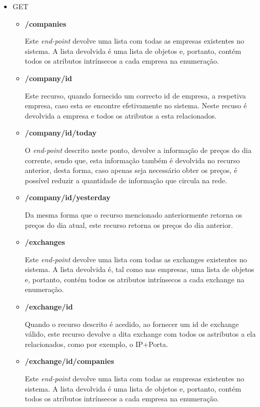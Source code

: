 \documentclass[a4paper,12pt]{article}
\begin{document}
\begin{itemize}
\item GET
  \begin{itemize}
    \item \textbf{/companies}
    \par Este \textit{end-point} devolve uma lista com todas as empresas existentes no sistema. A lista devolvida é uma lista de objetos e, portanto, contém todos os atributos intrínsecos a cada empresa na enumeração.
    
    \item \textbf{/company/{id}}
    \par Este recurso, quando fornecido um correcto id de empresa, a respetiva empresa, caso esta se encontre efetivamente no sistema. Neste recuso é devolvida a empresa e todos os atributos a esta relacionados.
    
    \item \textbf{/company/{id}/today}
    \par O \textit{end-point} descrito neste ponto, devolve a informação de preços do dia corrente, sendo que, esta informação também é devolvida no recurso anterior, desta forma, caso apenas seja necessário obter os preços, é possível reduzir a quantidade de informação que circula na rede.
    
    \item \textbf{/company/{id}/yesterday}
    \par Da mesma forma que o recurso mencionado anteriormente retorna os preços do dia atual, este recurso retorna os preços do dia anterior.
    
    \item \textbf{/exchanges}
    \par Este \textit{end-point} devolve uma lista com todas as exchanges existentes no sistema. A lista devolvida é, tal como nas empresas, uma lista de objetos e, portanto, contém todos os atributos intrínsecos a cada exchange na enumeração.

    \item \textbf{/exchange/{id}}
    \par Quando o recurso descrito é acedido, ao fornecer um id de exchange válido, este recurso devolve a dita exchange com todos os astributos a ela relacionados, como por exemplo, o IP+Porta.

    \item \textbf{/exchange/{id}/companies}
    \par Este \textit{end-point} devolve uma lista com todas as empresas existentes no sistema. A lista devolvida é uma lista de objetos e, portanto, contém todos os atributos intrínsecos a cada empresa na enumeração.
    

\end{itemize}
\end{itemize}
\end{document}
